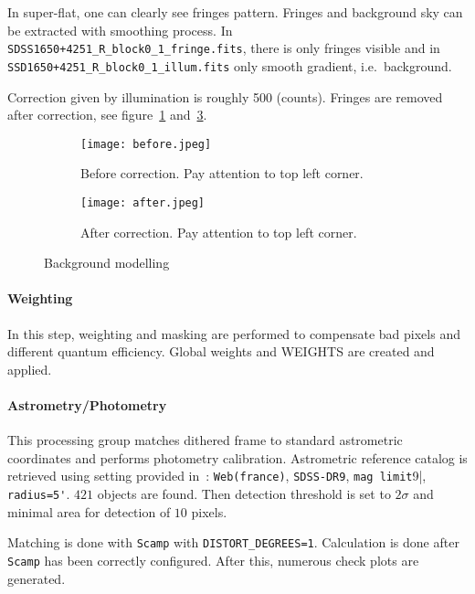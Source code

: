 In super-flat, one can clearly see fringes pattern. Fringes and background sky can be extracted with smoothing process. In \verb|SDSS1650+4251_R_block0_1_fringe.fits|, there is only fringes visible and in \verb|SSD1650+4251_R_block0_1_illum.fits| only smooth gradient, i.e.~background.

Correction given by illumination is roughly \num{500} (counts). Fringes are removed after correction, see figure~\ref{fig:before} and~\ref{fig:after}.
\begin{figure}[H]
   \centering
   \begin{subfigure}[t]{0.7\textwidth}
   \begin{center}
   \texttt{[image: before.jpeg]}
   \end{center}
   \caption{Before correction. Pay attention to top left corner.}
   \label{fig:before}
   \end{subfigure}
   \begin{subfigure}[t]{0.7\textwidth}
   \begin{center}
   \texttt{[image: after.jpeg]}
   \end{center}
   \caption{After correction. Pay attention to top left corner.}
   \label{fig:after}
   \end{subfigure}
	\caption{Background modelling}
\end{figure}

\paragraph{Weighting} 
In this step, weighting and masking are performed to compensate bad pixels and different quantum efficiency. Global weights and WEIGHTS are created and applied.

\paragraph{Astrometry/Photometry}
This processing group matches dithered frame to standard astrometric coordinates and performs photometry calibration. Astrometric reference catalog is retrieved using setting provided in~\cite{manual}: \verb|Web(france)|, \verb|SDSS-DR9|, \verb|mag limit|9|, \verb|radius=5'|. $421$ objects are found. Then detection threshold is set to $2\sigma$ and minimal area for detection of $10$ pixels.

Matching is done with \verb|Scamp| with \verb|DISTORT_DEGREES=1|. Calculation is done after \verb|Scamp| has been correctly configured. After this, numerous check plots are generated.

